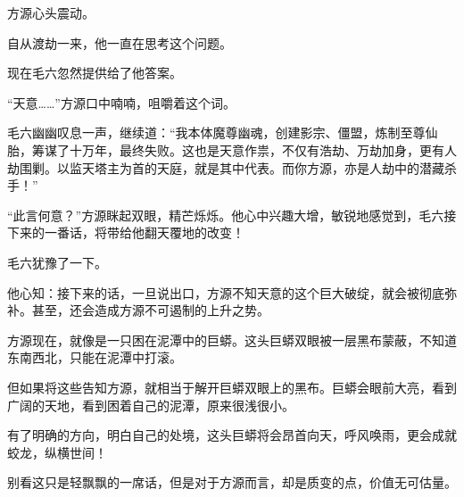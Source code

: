 \begin{this_body}
方源心头震动。

自从渡劫一来，他一直在思考这个问题。

现在毛六忽然提供给了他答案。

“天意……”方源口中喃喃，咀嚼着这个词。

毛六幽幽叹息一声，继续道：“我本体魔尊幽魂，创建影宗、僵盟，炼制至尊仙胎，筹谋了十万年，最终失败。这也是天意作祟，不仅有浩劫、万劫加身，更有人劫围剿。以监天塔主为首的天庭，就是其中代表。而你方源，亦是人劫中的潜藏杀手！”

“此言何意？”方源眯起双眼，精芒烁烁。他心中兴趣大增，敏锐地感觉到，毛六接下来的一番话，将带给他翻天覆地的改变！

毛六犹豫了一下。

他心知：接下来的话，一旦说出口，方源不知天意的这个巨大破绽，就会被彻底弥补。甚至，还会造成方源不可遏制的上升之势。

方源现在，就像是一只困在泥潭中的巨蟒。这头巨蟒双眼被一层黑布蒙蔽，不知道东南西北，只能在泥潭中打滚。

但如果将这些告知方源，就相当于解开巨蟒双眼上的黑布。巨蟒会眼前大亮，看到广阔的天地，看到困着自己的泥潭，原来很浅很小。

有了明确的方向，明白自己的处境，这头巨蟒将会昂首向天，呼风唤雨，更会成就蛟龙，纵横世间！

别看这只是轻飘飘的一席话，但是对于方源而言，却是质变的点，价值无可估量。

\end{this_body}


